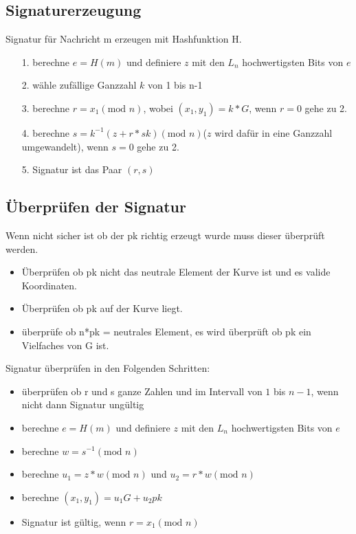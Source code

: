 \documentclass{scrartcl}
\begin{document}
\subsection*{Signaturerzeugung}
Signatur für Nachricht m erzeugen mit Hashfunktion H.
\begin{itemize}
\item[1.] berechne $e = H(m)$ und definiere $z$ mit den $L_n$ hochwertigsten Bits von $e$  
\item[2.] wähle zufällige Ganzzahl $k$ von 1 bis n-1
\item[3.] berechne $r = x_1 (\text{mod } n) $, wobei $(x_1, y_1) = k * G$, wenn $r = 0$ gehe zu 2.
\item[4.] berechne $s = k^{-1} ( z + r * sk) (\text{mod } n)$($z$ wird dafür in eine Ganzzahl umgewandelt), wenn $s = 0$ gehe zu 2.
\item[5.] Signatur ist das Paar $(r,s)$
\end{itemize}

\subsection*{Überprüfen der Signatur}
Wenn nicht sicher ist ob der pk richtig erzeugt wurde muss dieser überprüft werden.
\begin{itemize}
\item Überprüfen ob pk nicht das neutrale Element der Kurve ist und es valide Koordinaten.
\item Überprüfen ob pk auf der Kurve liegt.
\item überprüfe ob n*pk = neutrales Element, es wird überprüft ob pk ein Vielfaches von G ist.
\end{itemize}

Signatur überprüfen in den Folgenden Schritten:
\begin{itemize}
\item überprüfen ob r und s ganze Zahlen und im Intervall von $1$ bis $n-1$, wenn nicht dann Signatur ungültig
\item berechne $e = H(m)$ und definiere $z$ mit den $L_n$ hochwertigsten Bits von $e$
\item berechne $w = s^{-1} (\text{mod } n)$
\item berechne $u_1 = z * w 	(\text{mod } n)$ und $u_2 = r * w (\text{mod } n)$
\item berechne $(x_1,y_1) = u_1 G + u_2 pk$
\item Signatur ist gültig, wenn $r = x_1 (\text{mod } n)$ 
\end{itemize}
\end{document}
